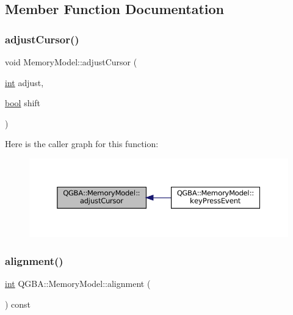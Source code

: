 \subsection{Member Function Documentation}
\mbox{\label{class_q_g_b_a_1_1_memory_model_a7a87523c5a952e03a4dfd1a501539577}} 
\subsubsection{\texorpdfstring{adjust\+Cursor()}{adjustCursor()}}
{\footnotesize\ttfamily void Memory\+Model\+::adjust\+Cursor (\begin{DoxyParamCaption}\item[{\mbox{\hyperlink{ioapi_8h_a787fa3cf048117ba7123753c1e74fcd6}{int}}}]{adjust,  }\item[{\mbox{\hyperlink{libretro_8h_a4a26dcae73fb7e1528214a068aca317e}{bool}}}]{shift }\end{DoxyParamCaption})\hspace{0.3cm}{\ttfamily [private]}}

Here is the caller graph for this function\+:
\nopagebreak
\begin{figure}[H]
\begin{center}
\leavevmode
\includegraphics[width=350pt]{class_q_g_b_a_1_1_memory_model_a7a87523c5a952e03a4dfd1a501539577_icgraph}
\end{center}
\end{figure}
\mbox{\label{class_q_g_b_a_1_1_memory_model_a3e869b2efe98e35941d0f117df50a5b4}} 
\subsubsection{\texorpdfstring{alignment()}{alignment()}}
{\footnotesize\ttfamily \mbox{\hyperlink{ioapi_8h_a787fa3cf048117ba7123753c1e74fcd6}{int}} Q\+G\+B\+A\+::\+Memory\+Model\+::alignment (\begin{DoxyParamCaption}{ }\end{DoxyParamCaption}) const\hspace{0.3cm}{\ttfamily [inline]}}

